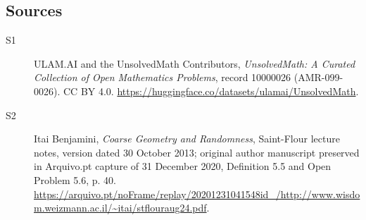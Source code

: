 \documentclass[11pt]{article}
\begin{document}
\subsection{Sources}
\begin{description}
\item[\hypertarget{source:10000026:1}{S1}] ULAM.AI and the UnsolvedMath Contributors, \emph{UnsolvedMath: A Curated Collection of Open Mathematics Problems}, record 10000026 (AMR-099-0026). CC BY 4.0. \url{https://huggingface.co/datasets/ulamai/UnsolvedMath}.
\item[\hypertarget{source:10000026:2}{S2}] Itai Benjamini, \emph{Coarse Geometry and Randomness}, Saint-Flour lecture notes, version dated 30 October 2013; original author manuscript preserved in Arquivo.pt capture of 31 December 2020, Definition 5.5 and Open Problem 5.6, p. 40. \url{https://arquivo.pt/noFrame/replay/20201231041548id_/http://www.wisdom.weizmann.ac.il/~itai/stflouraug24.pdf}.
\end{description}
\label{end:10000026}
\end{document}

